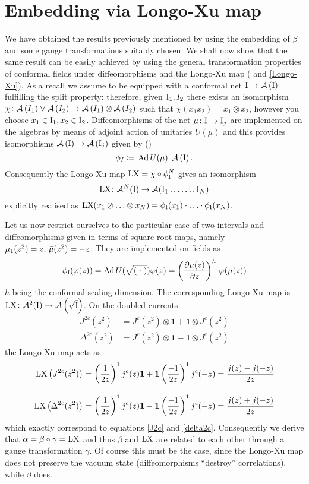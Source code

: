  \section{Embedding via Longo-Xu map}
 \label{Embedding via Longo-Xu map}
 We have obtained the results previously mentioned by using the 
 embedding of $\beta$ and some gauge transformations
 suitably chosen. We shall now show that the same
 result can be easily achieved by using the general 
 transformation properties of conformal fields under 
 diffeomorphisms and the Longo-Xu map (\cite{LX:2004}
 and \ref{Longo-Xu}). As a recall we assume to be equipped
 with a conformal net $\textrm{I}\to\mathcal{A}\left(\textrm{I}\right)$ fulfilling the 
 split property: therefore, given $\textrm{I}_1,I_2$ 
 there exists an isomorphism $\chi\colon\mathcal{A}\left(I_1\right)\vee
 \mathcal{A}\left(I_2\right)\to\mathcal{A}\left(I_1\right)\otimes\mathcal{A}\left(I_2\right)$ such that
 $\chi(x_1 x_2)=x_1\otimes x_2$, however you choose
 $x_1\in \textrm{I}_1,x_2\in\textrm{I}_2$. Diffeomorphisms of the net
 $\mu\colon\textrm{I}\to\textrm{I}_j$ are implemented on the algebras
 by means of adjoint action of unitaries $U(\mu)$ and
 this provides isomorphisms $\mathcal{A}\left(\textrm{I}\right)\to\mathcal{A}\left(\textrm{I}_j\right)$ 
 given by (\cite{LX:2004})
 \[
 \phi_I\coloneqq\left.\operatorname{Ad} U(\mu)\right|\mathcal{A}\left(\textrm{I}\right).
 \]
 Consequently the Longo-Xu map 
 $\textrm{LX}=\chi\circ\phi_{\textrm{I}}^N$ gives an 
 isomorphism 
 \[
 \textrm{LX}\colon\mathcal{A}^N(\textrm{I})\to\mathcal{A}
 (\textrm{I}_1\cup\ldots \cup\textrm{I}_N)
 \]
 explicitly realised as
 $\textrm{LX}(x_1\otimes\ldots\otimes x_N)=\phi_{\textrm{I}}(x_1)
 \cdot\ldots\cdot\phi_{\textrm{I}}(x_N)$.
 
 \bigskip
 Let us now restrict ourselves to the particular case
 of two intervals and diffeomorphisms given in terms of 
 square root maps, namely $\mu_1(z^2)=z,\,{}\mkern3mu\overline{\mkern-3mu\mu}(z^2)=-z$. 
 They are implemented on fields as 
 \[
 \phi_{\textrm{I}}(\varphi(z))=\operatorname{Ad} U(\sqrt{(\;{\cdot}\;)})\varphi(z)=
 \left(\frac{\partial \mu(z)}{\partial z}\right)^h\,
 \varphi(\mu(z))
 \]
 $h$ being the conformal scaling dimension. The corresponding Longo-Xu
 map is $\textrm{LX}\colon\mathcal{A}^2(\textrm{I})\to\mathcal{A}\left(\sqrt{\textrm{I}}\right)$. On the
 doubled currents 
 \begin{align*}
 J^{2c}(z^2)&=J^c(z^2)\otimes\bm{1}+\bm{1}\otimes J^c(z^2)\\
 \Delta^{2c}(z^2)&=J^c(z^2)\otimes\bm{1}-\bm{1}\otimes J^c(z^2)
 \end{align*}
 the Longo-Xu map acts as
 \begin{align*}
 \textrm{LX}\left(J^{2c}(z^2)\right)&=\left(\frac{1}{2z}\right)^1 j^c(z)\bm{1}
 + \bm{1}\left(\frac{-1}{2z}\right)^1 j^c(-z)=
 \frac{j(z)-j(-z)}{2z}\\[2ex]
 \textrm{LX}\left(\Delta^{2c}(z^2)\right)&=\left(\frac{1}{2z}\right)^1 j^c(z)\bm{1}
 - \bm{1}\left(\frac{-1}{2z}\right)^1 j^c(-z)=
 \frac{j(z)+j(-z)}{2z}
 \end{align*}
 which exactly correspond to equations \eqref{J2c} and \eqref{delta2c}.
 Consequently we derive that $\alpha=\beta\circ\gamma=\textrm{LX}$ and
 thus $\beta$ and $\textrm{LX}$ are related to each other through a gauge
 transformation $\gamma$. Of course this must be the case, since
 the Longo-Xu map does not preserve the vacuum state (diffeomorphisms
 ``destroy'' correlations), while $\beta$ does. 
 
